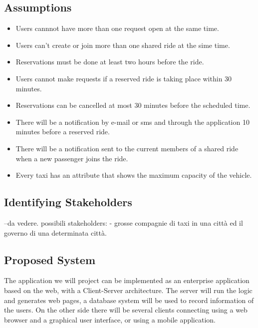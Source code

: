 \subsection{Assumptions}
\begin{itemize}
	\item Users cannnot have more than one request open at the same time.
	\item Users can't create or join more than one shared ride at the sime time.
	\item Reservations must be done at least two hours before the ride.
	\item Users cannot make requests if a reserved ride is taking place within 30 minutes.
	\item Reservations can be cancelled at most 30 minutes before the scheduled time.
	\item There will be a notification by e-mail or sms and through the application 10 minutes before a reserved ride.
	\item There will be a notification sent to  the current members of a shared ride when a new passenger joins the ride.
	\item Every taxi has an attribute that shows the maximum capacity of the vehicle.
\end{itemize}

\subsection{Identifying Stakeholders}

--da vedere. possibili stakeholders: - grosse compagnie di taxi in una città ed il governo di una determinata città.

\subsection{Proposed System}
The application we will project can be implemented as an enterprise application based on the web, with a Client-Server architecture. The server will run the logic and generates web pages, a database system will be used to record information of the users. On the other side there will be several clients connecting using a web browser and a graphical user interface, or using a mobile application.	

